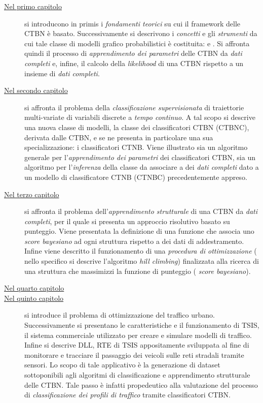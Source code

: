 \begin{description}
	\item[{\hyperref[cap:ctbn]{Nel primo capitolo}}]
	si introducono in primis i \emph{fondamenti teorici} su cui il framework delle \acf{CTBN} è basato. Successivamente si descrivono i \emph{concetti} e gli \emph{strumenti} da cui tale classe di modelli grafico probabilistici è costituita: \emph{\cim{}} e \emph{\stats{}}. Si affronta quindi il processo di \emph{apprendimento dei parametri} delle \acs{CTBN} da \emph{dati completi} e, infine, il calcolo della \emph{likelihood} di una \acs{CTBN} rispetto a un insieme di \emph{dati completi}.
	\item[{\hyperref[cap:ctbnc]{Nel secondo capitolo}}]
	si affronta il problema della \emph{classificazione supervisionata} di traiettorie multi-variate di variabili discrete a \emph{tempo continuo}. A tal scopo si descrive una nuova classe di modelli, la classe dei classificatori \acl{CTBN} (\acs{CTBNC}), derivata dalle \acs{CTBN}, e se ne presenta in particolare una sua specializzazione: i classificatori \acs{CTNB}. Viene illustrato sia un algoritmo generale per l'\emph{apprendimento dei parametri} dei classificatori \acs{CTBN}, sia un algoritmo per l'\emph{inferenza} della classe da associare a dei \emph{dati completi} dato a un modello di classificatore \acs{CTNB} (\acs{CTNBC}) precedentemente appreso.
	\item[{\hyperref[cap:structurallearning]{Nel terzo capitolo}}]
	si affronta il problema dell'\emph{apprendimento strutturale} di una \acs{CTBN} da \emph{dati completi}, per il quale si presenta un approccio risolutivo basato su punteggio. Viene presentata la definizione di una funzione che associa uno \emph{score bayesiano} ad ogni struttura rispetto a dei dati di addestramento. Infine viene descritto il funzionamento di una \emph{procedura di ottimizzazione} (\ie{} nello specifico si descrive l'algoritmo \emph{hill climbing}) finalizzata alla ricerca di una struttura che massimizzi la funzione di punteggio (\ie{} \emph{score bayesiano}).
	\item[{\hyperref[cap:ctbnr]{Nel quarto capitolo}}]
	\omissis{}
	\item[{\hyperref[cap:tsis-sensors]{Nel quinto capitolo}}]
	si introduce il problema di ottimizzazione del traffico urbano. Successivamente si presentano le caratteristiche e il funzionamento di \acf{TSIS}, il sistema commerciale utilizzato per creare e simulare modelli di traffico. Infine si descrive  \acs{DLL}, \acl{RTE} di \acs{TSIS} appositamente sviluppata al fine di monitorare e tracciare il passaggio dei veicoli sulle reti stradali tramite sensori. Lo scopo di tale applicativo è la generazione di dataset sottoponibili agli algoritmi di classificazione e apprendimento strutturale delle \acs{CTBN}. Tale passo è infatti propedeutico alla valutazione del processo di \emph{classificazione dei profili di traffico} tramite classificatori \acs{CTBN}.

\end{description}
